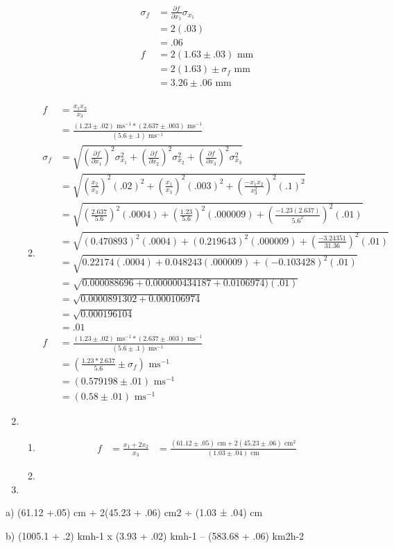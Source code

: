 \documentclass{article}
\begin{document}
\begin{enumerate}
\begin{enumerate}
\begin{align*}
\sigma_{f} &= \frac{\partial f}{\partial x_{1}}\sigma_{x_{1}}\\
&= 2(.03)\\
&= .06\\
f &= 2(1.63 \pm .03)\text{ mm}\\
&= 2(1.63) \pm \sigma_{f}\text{ mm}\\
&= 3.26 \pm .06\text{ mm}\\
\end{align*}
\item
\begin{align*}
f &= \frac{x_{1}x_{2}}{x_{3}}\\
&= \frac{(1.23 \pm .02)\text{ ms}^{-1} * (2.637 \pm .003)\text{ ms}^{-1}}{(5.6 \pm .1)\text{ ms}^{-1}}\\
\sigma_{f} &= \sqrt{(\frac{\partial f}{\partial x_{1}})^2\sigma_{x_{1}}^2 + (\frac{\partial f}{\partial x_{2}})^2\sigma_{x_{2}}^2 + (\frac{\partial f}{\partial x_{3}})^2\sigma_{x_{3}}^2}\\
&= \sqrt{(\frac{x_{2}}{x_{3}})^2(.02)^2 + (\frac{x_{1}}{x_{3}})^2(.003)^2 + (\frac{-x_{1}x_{2}}{x_{3}^2})^2(.1)^2}\\
&= \sqrt{(\frac{2.637}{5.6})^2(.0004) + (\frac{1.23}{5.6})^2(.000009) + (\frac{-1.23(2.637)}{5.6^2})^2(.01)}\\
&= \sqrt{(0.470893)^2(.0004) + (0.219643)^2(.000009) + (\frac{-3.24351}{31.36})^2(.01)}\\
&= \sqrt{0.22174(.0004) + 0.048243(.000009) + (-0.103428)^2(.01)}\\
&= \sqrt{0.000088696 + 0.000000434187 + 0.0106974)(.01)}\\
&= \sqrt{0.0000891302 + 0.000106974}\\
&= \sqrt{0.000196104}\\
&= .01\\
f &= \frac{(1.23 \pm .02)\text{ ms}^{-1} * (2.637 \pm .003)\text{ ms}^{-1}}{(5.6 \pm .1)\text{ ms}^{-1}}\\
&= (\frac{1.23 * 2.637}{5.6} \pm \sigma_{f})\text{ ms}^{-1}\\
&= (0.579198 \pm .01)\text{ ms}^{-1}\\
&= (0.58 \pm .01)\text{ ms}^{-1}
\end{align*}
\end{enumerate}
\item
\begin{enumerate}
\item
\begin{align*}
f &= \frac{x_{1} + 2x_{2}}{x_{3}}
&= \frac{(61.12 \pm .05)\text{ cm} + 2(45.23 \pm .06)\text{ cm}^2}{(1.03 \pm .04)\text{ cm}}
\end{align*}
\item
\end{enumerate}
\item
\end{enumerate}

a) (61.12 +.05) cm + 2(45.23 + .06) cm2 ÷ (1.03 ± .04) cm 

b) (1005.1 + .2) kmh-1 x (3.93 + .02) kmh-1 – (583.68 + .06) km2h-2
\end{document}
